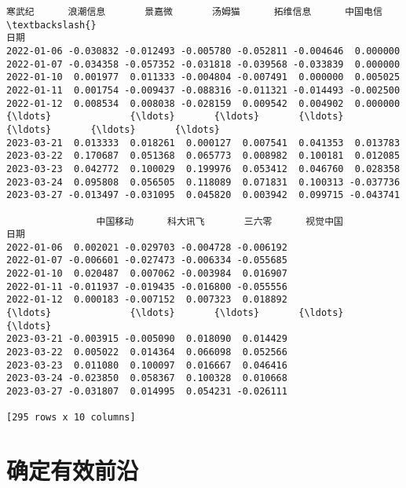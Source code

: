 \documentclass[11pt]{article}
\makeatletter
\newcommand{\boxspacing}{\kern\kvtcb@left@rule\kern\kvtcb@boxsep}
\newcommand{\prompt}[4]{
        {\ttfamily\llap{{\color{#2}[#3]:\hspace{3pt}#4}}\vspace{-\baselineskip}}
    }
\makeatother
\begin{document}
            \begin{tcolorbox}[breakable, size=fbox, boxrule=.5pt, pad at break*=1mm, opacityfill=0]
\prompt{Out}{outcolor}{6}{\boxspacing}
\begin{Verbatim}[commandchars=\\\{\}]
                 寒武纪      浪潮信息       景嘉微       汤姆猫      拓维信息      中国电信  \textbackslash{}
日期
2022-01-06 -0.030832 -0.012493 -0.005780 -0.052811 -0.004646  0.000000
2022-01-07 -0.034358 -0.057352 -0.031818 -0.039568 -0.033839  0.000000
2022-01-10  0.001977  0.011333 -0.004804 -0.007491  0.000000  0.005025
2022-01-11  0.001754 -0.009437 -0.088316 -0.011321 -0.014493 -0.002500
2022-01-12  0.008534  0.008038 -0.028159  0.009542  0.004902  0.000000
{\ldots}              {\ldots}       {\ldots}       {\ldots}       {\ldots}       {\ldots}       {\ldots}
2023-03-21  0.013333  0.018261  0.000127  0.007541  0.041353  0.013783
2023-03-22  0.170687  0.051368  0.065773  0.008982  0.100181  0.012085
2023-03-23  0.042772  0.100029  0.199976  0.053412  0.046760  0.028358
2023-03-24  0.095808  0.056505  0.118089  0.071831  0.100313 -0.037736
2023-03-27 -0.013497 -0.031095  0.045820  0.003942  0.099715 -0.043741

                中国移动      科大讯飞       三六零      视觉中国
日期
2022-01-06  0.002021 -0.029703 -0.004728 -0.006192
2022-01-07 -0.006601 -0.027473 -0.006334 -0.055685
2022-01-10  0.020487  0.007062 -0.003984  0.016907
2022-01-11 -0.011937 -0.019435 -0.016800 -0.055556
2022-01-12  0.000183 -0.007152  0.007323  0.018892
{\ldots}              {\ldots}       {\ldots}       {\ldots}       {\ldots}
2023-03-21 -0.003915 -0.005090  0.018090  0.014429
2023-03-22  0.005022  0.014364  0.066098  0.052566
2023-03-23  0.011080  0.100097  0.016667  0.046416
2023-03-24 -0.023850  0.058367  0.100328  0.010668
2023-03-27 -0.031807  0.014995  0.054231 -0.026111

[295 rows x 10 columns]
\end{Verbatim}
\end{tcolorbox}

    \hypertarget{ux786eux5b9aux6709ux6548ux524dux6cbf}{%
\section{确定有效前沿}\label{ux786eux5b9aux6709ux6548ux524dux6cbf}}
\end{document}

